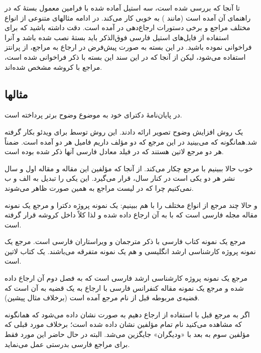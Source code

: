 \documentclass{article}
\theoremstyle{plain}\newtheorem{question}{پرسش}
\begin{document}
تا آنجا که بررسی شده است، سه استیل آماده شده با فرامین معمول بستهٔ  که در راهنمای آن آمده است (مانند ) به خوبی کار می‌کند. در ادامه مثالهای متنوعی از انواع مختلف مراجع و برخی دستورات ارجاع‌دهی در  آمده است. دقت داشته باشید که  برای استفاده از فایل‌های استیل فارسی فوق‌الذکر باید بستهٔ  نصب شده باشد و آنرا فراخوانی نموده باشید. در این بسته به صورت پیش‌فرض در ارجاع به مراجع، از پرانتز استفاده می‌شود، لیکن از آنجا که در این سند این بسته با ذکر \lr{[square]} فراخوانی شده است، مراجع با کروشه مشخص شده‌اند. 

\subsection{مثالها}\label{Sec:examples}

\citet{Borman04thesis} در پایان‌نامهٔ دکترای خود به موضوع وضوح برتر پرداخته است.

\citet{Amintoosi09precise} یک روش افزایش وضوح تصویر ارائه دادند. این روش توسط \citet{Amintoosi09video} برای ویدئو بکار گرفته شد.همانگونه که می‌بینید در این مرجع که دو مؤلف داریم فامیل هر دو آمده است. ضمناً هر دو مرجع لاتین هستند که در فیلد  معادل فارسی آنها ذکر شده بوده است.

خوب حالا ببینیم با مرجع \citep{Amintoosi09regional} چکار می‌کند. از آنجا که مؤلفین این مقاله و مقاله اول و سال نشر هر دو یکی است در کنار سال،  قرار می‌گیرد. این یکی را تبدیل به الف و ب نمی‌کنیم چرا که در لیست مراجع به همین صورت ظاهر می‌شوند.

و حالا چند مرجع از انواع مختلف  را با هم ببینیم:  \citet{Omidali82phdThesis} یک نمونه پروژه دکترا و  مرجع \citep{Vahedi87} یک نمونه مقاله مجله فارسی است که با  به آن ارجاع داده شده و لذا کلاً داخل کروشه قرار گرفته است.

مرجع \citep{Pedram80osool} یک نمونه کتاب فارسی با ذکر مترجمان و ویراستاران فارسی است. مرجع \citep{Khalighi07MscThesis}  یک نمونه پروژه کارشناسی ارشد انگلیسی و \citet{Khalighi87xepersian} هم یک نمونه متفرقه  می‌باشند.\citet{Gonzalez02book} یک کتاب لاتین است.

 مرجع \citet[فصل ۲]{Pourmousa88mscThesis} یک نمونه پروژه کارشناسی ارشد فارسی است که به فصل دوم آن ارجاع داده شده و مرجع \citep[قضیه‌ی ۲،][]{Amintoosi87afzayesh}  یک نمونه  مقاله کنفرانس فارسی با ارجاع به یک قضیه به آن است که قضیه‌ی مربوطه قبل از نام مرجع آمده است (برخلاف مثال پیشین).

 اگر به  مرجع قبل با استفاده از  ارجاع دهیم به صورت \citealp*{Amintoosi87afzayesh} نشان داده می‌شود که همانگونه که مشاهده می‌کنید نام تمام مؤلفین نشان داده شده است؛ برخلاف مورد قبلی که مؤلفین سوم به بعد با «ودیگران» جایگزین می‌شد. البته در حال حاضر این مورد فقط برای مراجع فارسی بدرستی عمل می‌نماید. 
\end{document}
